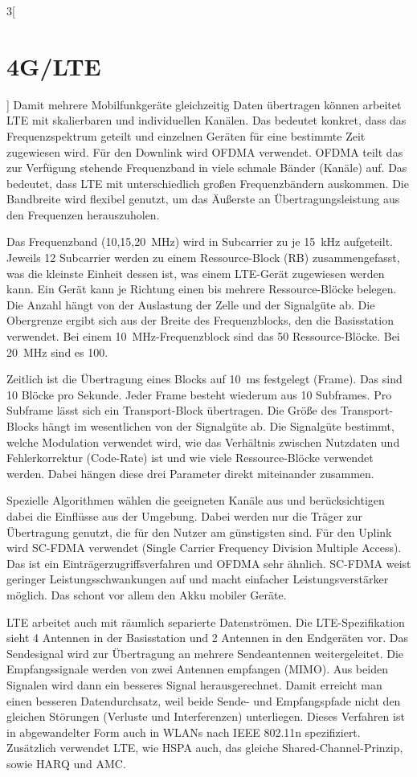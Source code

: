 \begin{multicols}{3}[\section{4G/LTE}]
Damit mehrere Mobilfunkgeräte gleichzeitig Daten übertragen können arbeitet LTE mit skalierbaren und individuellen Kanälen. Das bedeutet konkret, dass das Frequenzspektrum geteilt und einzelnen Geräten für eine bestimmte Zeit zugewiesen wird.
Für den Downlink wird OFDMA verwendet. OFDMA teilt das zur Verfügung stehende Frequenzband in viele schmale Bänder (Kanäle) auf. Das bedeutet, dass LTE mit unterschiedlich großen Frequenzbändern auskommen. Die Bandbreite wird flexibel genutzt, um das Äußerste an Übertragungsleistung aus den Frequenzen herauszuholen.

Das Frequenzband (\si{10},\si{15},\SI{20}{\mega\hertz}) wird in Subcarrier zu je \SI{15}{\kilo\hertz} aufgeteilt. Jeweils 12 Subcarrier werden zu einem Ressource-Block (RB) zusammengefasst, was die kleinste Einheit dessen ist, was einem LTE-Gerät zugewiesen werden kann. Ein Gerät kann je Richtung einen bis mehrere Ressource-Blöcke belegen. Die Anzahl hängt von der Auslastung der Zelle und der Signalgüte ab. Die Obergrenze ergibt sich aus der Breite des Frequenzblocks, den die Basisstation verwendet. Bei einem \SI{10}{\mega\hertz}-Frequenzblock sind das 50 Ressource-Blöcke. Bei \SI{20}{\mega\hertz} sind es 100.

Zeitlich ist die Übertragung eines Blocks auf \SI{10}{\milli\second} festgelegt (Frame). Das sind 10 Blöcke pro Sekunde. Jeder Frame besteht wiederum aus 10 Subframes. Pro Subframe lässt sich ein Transport-Block übertragen. Die Größe des Transport-Blocks hängt im wesentlichen von der Signalgüte ab. Die Signalgüte bestimmt, welche Modulation verwendet wird, wie das Verhältnis zwischen Nutzdaten und Fehlerkorrektur (Code-Rate) ist und wie viele Ressource-Blöcke verwendet werden. Dabei hängen diese drei Parameter direkt miteinander zusammen.

Spezielle Algorithmen wählen die geeigneten Kanäle aus und berücksichtigen dabei die Einflüsse aus der Umgebung. Dabei werden nur die Träger zur Übertragung genutzt, die für den Nutzer am günstigsten sind.
Für den Uplink wird SC-FDMA verwendet (Single Carrier Frequency Division Multiple Access). Das ist ein Einträgerzugriffsverfahren und OFDMA sehr ähnlich. SC-FDMA weist geringer Leistungsschwankungen auf und macht einfacher Leistungsverstärker möglich. Das schont vor allem den Akku mobiler Geräte.

LTE arbeitet auch mit räumlich separierte Datenströmen. Die LTE-Spezifikation sieht 4 Antennen in der Basisstation und 2 Antennen in den Endgeräten vor. Das Sendesignal wird zur Übertragung an mehrere Sendeantennen weitergeleitet. Die Empfangssignale werden von zwei Antennen empfangen (MIMO). Aus beiden Signalen wird dann ein besseres Signal herausgerechnet. Damit erreicht man einen besseren Datendurchsatz, weil beide Sende- und Empfangspfade nicht den gleichen Störungen (Verluste und Interferenzen) unterliegen. Dieses Verfahren ist in abgewandelter Form auch in WLANs nach IEEE 802.11n spezifiziert. Zusätzlich verwendet LTE, wie HSPA auch, das gleiche Shared-Channel-Prinzip, sowie HARQ und AMC. ~\cite{4GLTE.4}
 


\end{multicols}
